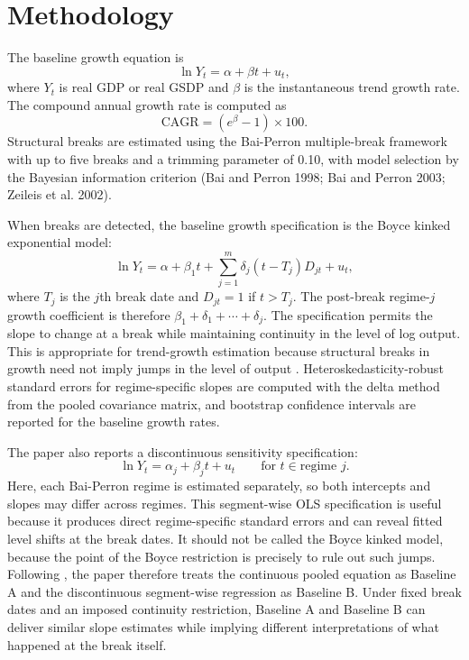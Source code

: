 \documentclass[11pt,a4paper]{article}
\begin{document}
\section{Methodology}

The baseline growth equation is
\begin{equation}
\ln Y_t = \alpha + \beta t + u_t,
\end{equation}
where $Y_t$ is real GDP or real GSDP and $\beta$ is the instantaneous trend growth rate. The compound annual growth rate is computed as
\begin{equation}
\mathrm{CAGR} = \left(e^\beta - 1\right)\times 100.
\end{equation}
Structural breaks are estimated using the Bai-Perron multiple-break framework with up to five breaks and a trimming parameter of 0.10, with model selection by the Bayesian information criterion (Bai and Perron 1998; Bai and Perron 2003; Zeileis et al. 2002).

When breaks are detected, the baseline growth specification is the Boyce kinked exponential model:
\begin{equation}
\ln Y_t = \alpha + \beta_1 t + \sum_{j=1}^{m}\delta_j(t-T_j)D_{jt} + u_t,
\end{equation}
where $T_j$ is the $j$th break date and $D_{jt}=1$ if $t>T_j$. The post-break regime-$j$ growth coefficient is therefore $\beta_1+\delta_1+\cdots+\delta_j$. The specification permits the slope to change at a break while maintaining continuity in the level of log output. This is appropriate for trend-growth estimation because structural breaks in growth need not imply jumps in the level of output \citep{boyce_1986}. Heteroskedasticity-robust standard errors for regime-specific slopes are computed with the delta method from the pooled covariance matrix, and bootstrap confidence intervals are reported for the baseline growth rates.

The paper also reports a discontinuous sensitivity specification:
\begin{equation}
\ln Y_t = \alpha_j + \beta_j t + u_t \qquad \text{for } t \in \text{regime } j.
\end{equation}
Here, each Bai-Perron regime is estimated separately, so both intercepts and slopes may differ across regimes. This segment-wise OLS specification is useful because it produces direct regime-specific standard errors and can reveal fitted level shifts at the break dates. It should not be called the Boyce kinked model, because the point of the Boyce restriction is precisely to rule out such jumps. Following \citet{balakrishnan_parameswaran_2007}, the paper therefore treats the continuous pooled equation as Baseline A and the discontinuous segment-wise regression as Baseline B. Under fixed break dates and an imposed continuity restriction, Baseline A and Baseline B can deliver similar slope estimates while implying different interpretations of what happened at the break itself.
\end{document}
